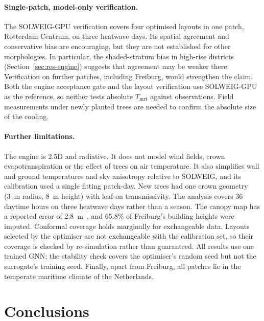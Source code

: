 \documentclass[preprint,12pt,authoryear]{elsarticle}
\newcommand{\tmrt}{\ensuremath{T_\mathrm{mrt}}}
\begin{document}
\paragraph{Single-patch, model-only verification.} The SOLWEIG-GPU verification covers four optimised layouts in one patch, Rotterdam Centrum, on three heatwave days. Its spatial agreement and conservative bias are encouraging, but they are not established for other morphologies. In particular, the shaded-stratum bias in high-rise districts (Section~\ref{sec:res-engine}) suggests that agreement may be weaker there. Verification on further patches, including Freiburg, would strengthen the claim. Both the engine acceptance gate and the layout verification use SOLWEIG-GPU as the reference, so neither tests absolute \tmrt{} against observations. Field measurements under newly planted trees are needed to confirm the absolute size of the cooling.

\paragraph{Further limitations.} The engine is 2.5D and radiative. It does not model wind fields, crown evapotranspiration or the effect of trees on air temperature. It also simplifies wall and ground temperatures and sky anisotropy relative to SOLWEIG, and its calibration used a single fitting patch-day. New trees had one crown geometry (3~m radius, 8~m height) with leaf-on transmissivity. The analysis covers 36 daytime hours on three heatwave days rather than a season. The canopy map has a reported error of 2.8~m~\citep{tolan2024}, and 65.8\% of Freiburg's building heights were imputed. Conformal coverage holds marginally for exchangeable data. Layouts selected by the optimiser are not exchangeable with the calibration set, so their coverage is checked by re-simulation rather than guaranteed. All results use one trained GNN; the stability check covers the optimiser's random seed but not the surrogate's training seed. Finally, apart from Freiburg, all patches lie in the temperate maritime climate of the Netherlands.

\section{Conclusions}\label{sec:conclusions}
\end{document}

